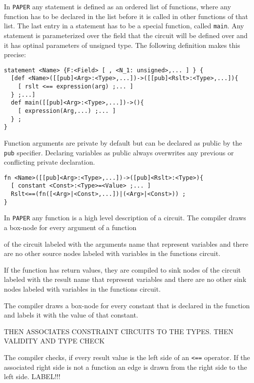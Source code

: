 In \texttt{PAPER} any statement is defined as an ordered list of functions, where any function has to be declared in the list before it is called in other functions of that list. The last entry in a statement has to be a special function, called \texttt{main}. Any statement is parameterized over the field that the circuit will be defined over and it has optinal parameters of unsigned type. The following definition makes this precise: 
\begin{lstlisting}
statement <Name> {F:<Field> [ , <N_1: unsigned>,... ] } {
  [def <Name>([[pub]<Arg>:<Type>,...])->([[pub]<Rslt>:<Type>,...]){
    [ rslt <== expression(arg) ;... ]
  } ;...]
  def main([[pub]<Arg>:<Type>,...])->(){
    [ expression(Arg,...) ;... ]
  } ;
}
\end{lstlisting}
Function arguments are private by default but can be declared as public by the \texttt{pub} specifier. Declaring variables as public always overwrites any previous or conflicting private declaration. 

\begin{lstlisting}
fn <Name>([[pub]<Arg>:<Type>,...])->([pub]<Rslt>:<Type>){
  [ constant <Const>:<Type>=<Value> ;... ]
  Rslt<==(fn([<Arg>|<Const>,...])|(<Arg>|<Const>)) ;
}
\end{lstlisting}

In \texttt{PAPER} any function is a high level description of a circuit. The compiler draws a box-node for every argument of a function 

of the circuit labeled with the arguments name that represent variables and there are no other source nodes labeled with variables in the functions circuit. 

If the function has return values, they are compiled to sink nodes of the circuit labeled with the result name that represent variables and there are no other sink nodes labeled with variables in the functions circuit. 

The compiler draws a box-node for every constant that is declared in the function and labels it with the value of that constant.

THEN ASSOCIATES CONSTRAINT CIRCUITS TO THE TYPES. THEN VALIDITY AND TYPE CHECK

The compiler checks, if every result value is the left side of an \texttt{<==} operator. If the associated right side is not a function an edge is drawn from the right side to the left side. LABEL!!! 

